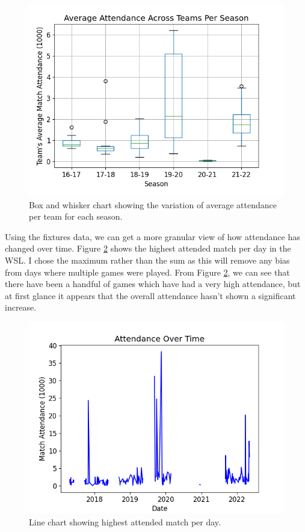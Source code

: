 \documentclass[12pt, a4paper, twocolumn]{article}
\begin{document}
\begin{figure}
  \includegraphics[width=\linewidth]{../vis/tables/attendance_boxwhisker.png}
  \caption{Box and whisker chart showing the variation of average attendance per team for each season.}
  \label{att_box}
\end{figure}

Using the fixtures data, we can get a more granular view of how attendance has changed over time. Figure \ref{att_ot} shows the highest attended match per day in the WSL. I chose the maximum rather than the sum as this will remove any bias from days where multiple games were played. From Figure \ref{att_ot}, we can see that there have been a handful of games which have had a very high attendance, but at first glance it appears that the overall attendance hasn't shown a significant increase.

\begin{figure}
  \includegraphics[width=\linewidth]{../vis/fixtures/attendance_overtime.png}
  \caption{Line chart showing highest attended match per day.}
  \label{att_ot}
\end{figure}
\end{document}
